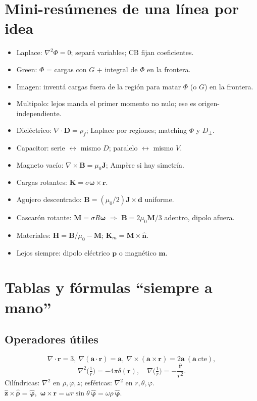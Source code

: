 \documentclass[10pt,a4paper]{article}
\newcommand{\vect}[1]{\mathbf{#1}}
\newcommand{\uv}[1]{\hat{\mathbf{#1}}}
\newcommand{\muo}{\mu_0}
\begin{document}
\section{Mini-resúmenes de una línea por idea}
\begin{itemize}
\item Laplace: $\nabla^2\Phi=0$; separá variables; CB fijan coeficientes.
\item Green: $\Phi$ = cargas con $G$ + integral de $\Phi$ en la frontera.
\item Imagen: inventá cargas fuera de la región para matar $\Phi$ (o $G$) en la frontera.
\item Multipolo: lejos manda el primer momento no nulo; ese es origen-independiente.
\item Dieléctrico: $\nabla\cdot\vect{D}=\rho_f$; Laplace por regiones; matching $\Phi$ y $D_\perp$.
\item Capacitor: serie $\leftrightarrow$ mismo $D$; paralelo $\leftrightarrow$ mismo $V$.
\item Magneto vacío: $\nabla\times\vect{B}=\muo\vect{J}$; Ampère si hay simetría.
\item Cargas rotantes: $\vect{K}=\sigma\boldsymbol{\omega}\times\vect{r}$.
\item Agujero descentrado: $\vect{B}=(\muo/2)\vect{J}\times\vect{d}$ uniforme.
\item Cascarón rotante: $\vect{M}=\sigma R\boldsymbol{\omega}$ $\Rightarrow$ $\vect{B}=2\muo\vect{M}/3$ adentro, dipolo afuera.
\item Materiales: $\vect{H}=\vect{B}/\muo-\vect{M}$; $\vect{K}_m=\vect{M}\times\uv{n}$.
\item Lejos siempre: dipolo eléctrico $\vect{p}$ o magnético $\vect{m}$.
\end{itemize}

\section{Tablas y fórmulas ``siempre a mano''}

\subsection{Operadores útiles}
\[
\nabla\cdot\vect{r}=3,\ 
\nabla(\vect{a}\cdot\vect{r})=\vect{a},\ 
\nabla\times(\vect{a}\times\vect{r})=2\vect{a}\ (\vect{a}\ \mathrm{cte}),
\]
\[
\nabla^2\big(\tfrac1r\big)=-4\pi\delta(\vect{r}),\quad
\nabla\big(\tfrac1r\big)=-\frac{\uv{r}}{r^2}.
\]
Cilíndricas: $\nabla^2$ en $\rho,\varphi,z$; esféricas: $\nabla^2$ en $r,\theta,\varphi$.\\
$\uv{z}\times\uv{\rho}=\uv{\varphi}$,\ $\boldsymbol{\omega}\times\vect{r}=\omega r\sin\theta\,\uv{\varphi}=\omega\rho\,\uv{\varphi}$.
\end{document}

